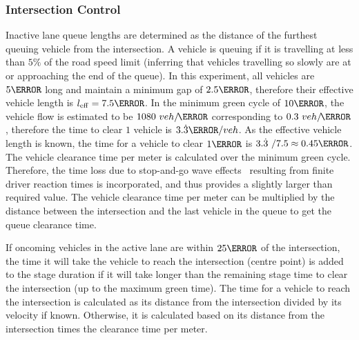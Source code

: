 \documentclass[numbered]{trbunofficial}
\newcommand{\sidiv}{/\hspace{-1.5pt}} %
\begin{document}
\subsubsection{Intersection Control}
Inactive lane queue lengths are determined as the distance of the furthest queuing vehicle from the intersection. A vehicle is queuing if it is travelling at less than $5\%$ of the road speed limit (inferring that vehicles travelling so slowly are at or approaching the end of the queue). In this experiment, all vehicles are $5\m$ long and maintain a minimum gap of $2.5\m$, therefore their effective vehicle length is $l_{\rm eff} =7.5\m$. In the minimum green cycle of $10\s$, the vehicle flow is estimated to be $1080\ veh\sidiv\hour$ corresponding to $0.3\ veh\sidiv\s$, therefore the time to clear $1$ vehicle is $3.\dot{3}\s/veh$. As the effective vehicle length is known, the time for a vehicle to clear $1\m$ is $3.\dot{3}\ /7.5 \approx 0.45\s$. The vehicle clearance time per meter is calculated over the minimum green cycle. Therefore, the time loss due to stop-and-go wave effects~\cite{Wilson2008} resulting from finite driver reaction times is incorporated, and thus provides a slightly larger than required value. The vehicle clearance time per meter can be multiplied by the distance between the intersection and the last vehicle in the queue to get the queue clearance time.

If oncoming vehicles in the active lane are within $25\m$ of the intersection, the time it will take the vehicle to reach the intersection (centre point) is added to the stage duration if it will take longer than the remaining stage time to clear the intersection (up to the maximum green time). The time for a vehicle to reach the intersection is calculated as its distance from the intersection divided by its velocity if known. Otherwise, it is calculated based on its distance from the intersection times the clearance time per meter.
\end{document}
